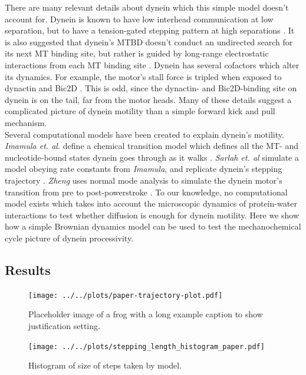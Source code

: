 \documentclass[9pt,twocolumn,twoside]{pnas-new}
\begin{document}
There are many relevant details about dynein which this simple model doesn't account for. Dynein is known to have low interhead communication at low separation, but to have a tension-gated stepping pattern at high separations \cite{yildizpaper}. It is also suggested that dynein's MTBD doesn't conduct an undirected search for its next MT binding site, but rather is guided by long-range electrostatic interactions from each MT binding site \cite{longrangemt}. Dynein has several cofactors which alter its dynamics. For example, the motor's stall force is tripled when exposed to dynactin and Bic2D \cite{yildizdynactin}. This is odd, since the dynactin- and Bic2D-binding site on dynein is on the tail, far from the motor heads. Many of these details suggest a complicated picture of dynein motility than a simple forward kick and pull mechanism.\\

Several computational models have been created to explain dynein's motility. \textit{Imamula et. al.} define a chemical transition model which defines all the MT- and nucleotide-bound states dynein goes through as it walks \cite{imamulamodel}. \textit{Sarlah et. al} simulate a model obeying rate constants from \textit{Imamula}, and replicate dynein's stepping trajectory \cite{sarlahmodel}. \textit{Zheng} uses normal mode analysis to simulate the dynein motor's transition from pre to post-powerstroke \cite{normalmodes}. To our knowledge, no computational model exists which takes into account the microscopic dynamics of protein-water interactions to test whether diffusion is enough for dynein motility. Here we show how a simple Brownian dynamics model can be used to test the mechanochemical cycle picture of dynein processivity.\\

\subsection*{Results}

\begin{figure}%
\centering
\texttt{[image: ../../plots/paper-trajectory-plot.pdf]}
\caption{Placeholder image of a frog with a long example caption to show justification setting.}
\label{fig:trajectory}
\end{figure}

\begin{figure}%
\centering
\texttt{[image: ../../plots/stepping\_length\_histogram\_paper.pdf]}
\caption{Histogram of size of steps taken by model.}
\label{fig:lengthhist}
\end{figure}
\end{document}

